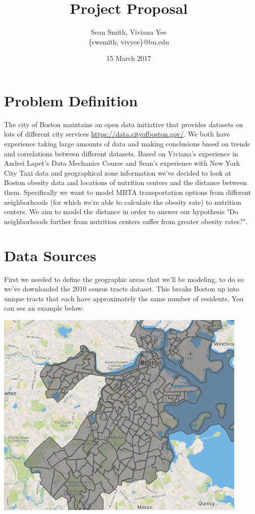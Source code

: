 \documentclass[12pt]{article}
\title{Project Proposal}
\author{Sean Smith, Viviana Yee \\ \{swsmith, vivyee\}@bu.edu}
\date{15 March 2017}
\begin{document}
\maketitle


\section{Problem Definition}
	The city of Boston maintains an open data initiative that provides datasets on lots of different city services \url{https://data.cityofboston.gov/}. We both have experience taking large amounts of data and making conclusions based on trends and correlations between different datasets. Based on Viviana's experience in Andrei Lapet's Data Mechanics Course and Sean's experience with New York City Taxi data and geographical zone information we've decided to look at Boston obesity data and locations of nutrition centers and the distance between them. Specifically we want to model MBTA transportation options from different neighborhoods (for which we're able to calculate the obesity rate) to nutrition centers. We aim to model the distance in order to answer our hypothesis "Do neighborhoods further from nutrition centers suffer from greater obesity rates?". 
 
 \section{Data Sources}
	First we needed to define the geographic areas that we'll be modeling, to do so we've downloaded the 2010 census tracts dataset. This breaks Boston up into unique tracts that each have approximately the same number of residents. You can see an example below:

\includegraphics[height=4in]{boston_neighborhoods.png}
\end{document}
